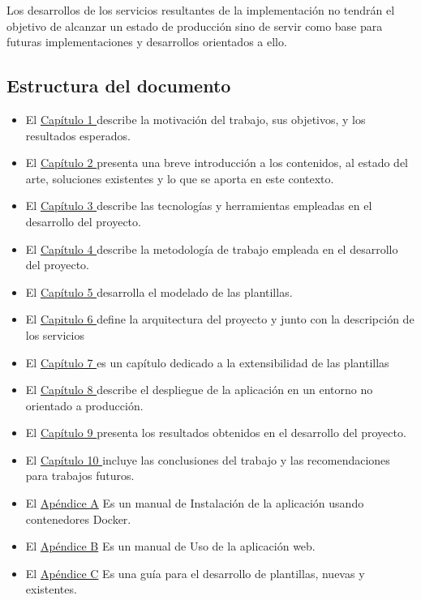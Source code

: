 \documentclass[12pt, a4paper, twoside]{article}
\begin{document}
Los desarrollos de los servicios resultantes de la implementación no tendrán el objetivo de alcanzar un estado de producción sino de servir como base para futuras implementaciones y desarrollos orientados a ello. 

\subsection{Estructura del documento}

\begin{itemize}[label=\textbullet]
	\item El \hyperref[sec:Introduccion]{Capítulo 1 } describe la motivación del trabajo, sus objetivos, y los resultados esperados.
	\item El \hyperref[sec:Estado del Arte]{Capítulo 2 } presenta una breve introducción a los contenidos, al estado del arte, soluciones existentes y lo que se aporta en este contexto.
	\item El \hyperref[sec:Tecnologias Empleadas]{Capítulo 3 } describe las tecnologías y herramientas empleadas en el desarrollo del proyecto.
	\item El \hyperref[sec:Metodologia]{Capítulo 4 } describe la metodología de trabajo empleada en el desarrollo del proyecto.
	\item El \hyperref[sec:Modelado de las plantillas]{Capítulo 5 } desarrolla el modelado de las plantillas.
	\item El \hyperref[sec:Arquitectura y Descripción del sistema]{Capitulo 6 } define la arquitectura del proyecto y junto con la descripción de los servicios
	\item El \hyperref[sec:Extensibilidad]{Capítulo 7 } es un capítulo dedicado a la extensibilidad de las plantillas
	\item El \hyperref[sec:Despliegue de la aplicación]{Capítulo 8 }  describe el despliegue de la aplicación en un entorno no orientado a producción.
	\item El \hyperref[sec:Resultados]{Capítulo 9 } presenta los resultados obtenidos en el desarrollo del proyecto.
	\item El \hyperref[sec:Conclusiones]{Capítulo 10 } incluye las conclusiones del trabajo y las recomendaciones para trabajos futuros.
	\item El \hyperref[sec:Manual de Instalación]{Apéndice A} Es un manual de Instalación de la aplicación usando contenedores Docker.
	\item El \hyperref[sec:Manual de Uso]{Apéndice B} Es un manual de Uso de la aplicación web.
	\item El \hyperref[sec:Manual de Desarrollo]{Apéndice C} Es una guía para el desarrollo de plantillas, nuevas y existentes.
\end{itemize}
\end{document}
